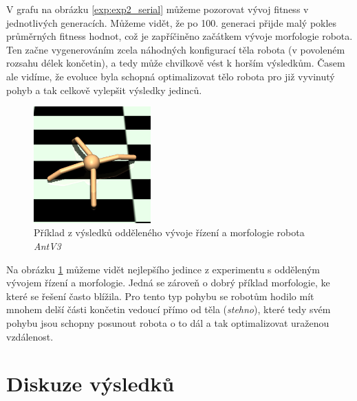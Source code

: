 V grafu na obrázku \ref{exp:exp2_serial} můžeme pozorovat vývoj fitness v
jednotlivých generacích. Můžeme vidět, že po 100. generaci přijde malý pokles
průměrných fitness hodnot, což je zapříčiněno začátkem vývoje morfologie
robota. Ten začne vygenerováním zcela náhodných konfigurací těla robota (v
povoleném rozsahu délek končetin), a tedy může chvilkově vést k horším
výsledkům. Časem ale vidíme, že evoluce byla schopná optimalizovat tělo robota
pro již vyvinutý pohyb a tak celkově vylepšit výsledky jedinců.

\begin{figure}[h!]
    \centering
    \includegraphics[width=0.4\textwidth]{../img/crop_exp2_serial_top1.jpg}
    \caption{Příklad z výsledků odděleného vývoje řízení a morfologie robota
    \emph{AntV3}}
    \label{fig:exp2_serial_body_show}
\end{figure}

Na obrázku \ref{fig:exp2_serial_body_show} můžeme vidět nejlepšího jedince z
experimentu s odděleným vývojem řízení a morfologie. Jedná se zároveň o dobrý
příklad morfologie, ke které se řešení často blížila. Pro tento typ pohybu se 
robotům hodilo mít mnohem delší části končetin vedoucí přímo od těla
(\emph{stehno}), které tedy svém pohybu jsou schopny posunout robota o to
dál a tak optimalizovat uraženou vzdálenost.

\section{Diskuze výsledků}
